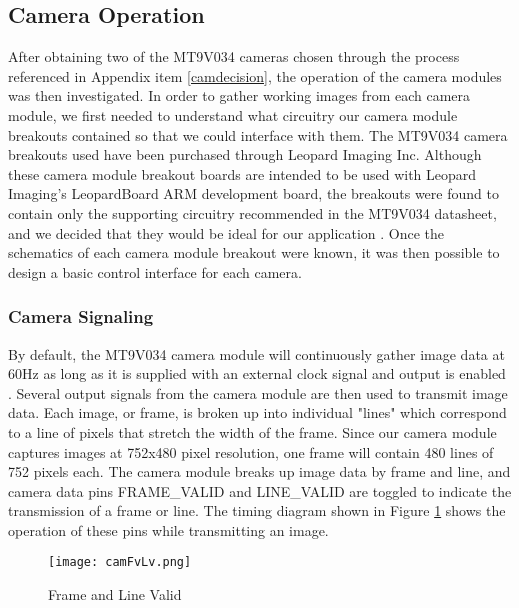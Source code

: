\subsection{Camera Operation}
After obtaining two of the MT9V034 cameras chosen through the process referenced in Appendix item \ref{camdecision}, the operation of the camera modules was then investigated. In order to gather working images from each camera module, we first needed to understand what circuitry our camera module breakouts contained so that we could interface with them. The MT9V034 camera breakouts used have been purchased through Leopard Imaging Inc. Although these camera module breakout boards are intended to be used with Leopard Imaging's LeopardBoard ARM development board, the breakouts were found to contain only the supporting circuitry recommended in the MT9V034 datasheet, and we decided that they would be ideal for our application \cite{livm34lp,mt9v034}. Once the schematics of each camera module breakout were known, it was then possible to design a basic control interface for each camera.
\subsubsection{Camera Signaling}
By default, the MT9V034 camera module will continuously gather image data at 60Hz  as long as it is supplied with an external clock signal and output is enabled \cite{mt9v034}. Several output signals from the camera module are then used to transmit image data. Each image, or frame, is broken up into individual "lines" which correspond to a line of pixels that stretch the width of the frame. Since our camera module captures images at 752x480 pixel resolution, one frame will contain 480 lines of 752 pixels each. The camera module breaks up image data by frame and line, and camera data pins FRAME\_VALID and LINE\_VALID are toggled to indicate the transmission of a frame or line. The timing diagram shown in Figure \ref{FvLv} shows the operation of these pins while transmitting an image.

\begin{figure}[H]
	\centerline{\texttt{[image: camFvLv.png]}}
	\caption{Frame and Line Valid \cite{mt9v034}}
	\label{FvLv}
\end{figure}

